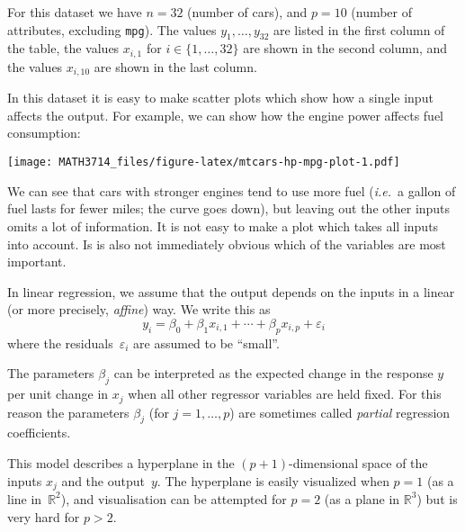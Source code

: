 \documentclass[
  a4paper,
]{article}
\newenvironment{Shaded}{\begin{snugshade}}{\end{snugshade}}
\newcommand{\AttributeTok}[1]{\textcolor[rgb]{0.77,0.63,0.00}{#1}}
\newcommand{\FunctionTok}[1]{\textcolor[rgb]{0.00,0.00,0.00}{#1}}
\newcommand{\NormalTok}[1]{#1}
\newcommand{\SpecialCharTok}[1]{\textcolor[rgb]{0.00,0.00,0.00}{#1}}
\newcommand{\StringTok}[1]{\textcolor[rgb]{0.31,0.60,0.02}{#1}}
\theoremstyle{definition}
\theoremstyle{definition}
\theoremstyle{definition}
\theoremstyle{definition}
\theoremstyle{remark}
\begin{document}
For this dataset we have \(n = 32\) (number of cars), and \(p = 10\) (number
of attributes, excluding \texttt{mpg}). The values \(y_1, \ldots, y_{32}\) are listed
in the first column of the table, the values \(x_{i,1}\) for \(i \in \{1, \ldots, 32\}\) are shown in the second column, and the values \(x_{i,10}\) are shown in
the last column.

In this dataset it is easy to make scatter plots which show how a single
input affects the output. For example, we can show how the engine power
affects fuel consumption:

\begin{Shaded}
\end{Shaded}

\texttt{[image: MATH3714\_files/figure-latex/mtcars-hp-mpg-plot-1.pdf]}

We can see that cars with stronger engines tend to use more fuel
(\emph{i.e.}~a gallon of fuel lasts for fewer miles; the curve goes down),
but leaving out the other inputs omits a lot of information. It is
not easy to make a plot which takes all inputs into account. Is is
also not immediately obvious which of the variables are most
important.

In linear regression, we assume that the output depends on the
inputs in a linear (or more precisely, \emph{affine}) way. We write
this as
\begin{equation}
  y_i
  = \beta_0 + \beta_1 x_{i,1} + \cdots + \beta_p x_{i,p} + \varepsilon_i \label{eq:lmdata}
\end{equation}
where the residuals~\(\varepsilon_i\) are assumed to be ``small''.

The parameters \(\beta_j\) can be interpreted as the expected change in
the response \(y\) per unit change in \(x_j\) when all other regressor
variables are held fixed. For this reason the parameters \(\beta_j\)
(for \(j=1, \ldots, p\)) are sometimes called \emph{partial} regression
coefficients.

This model describes a hyperplane in the \((p+1)\)-dimensional space of
the inputs \(x_j\) and the output~\(y\). The hyperplane is easily
visualized when \(p=1\) (as a line in~\(\mathbb{R}^2\)), and visualisation can be
attempted for \(p=2\) (as a plane in \(\mathbb{R}^3\)) but is very hard for \(p>2\).
\end{document}
